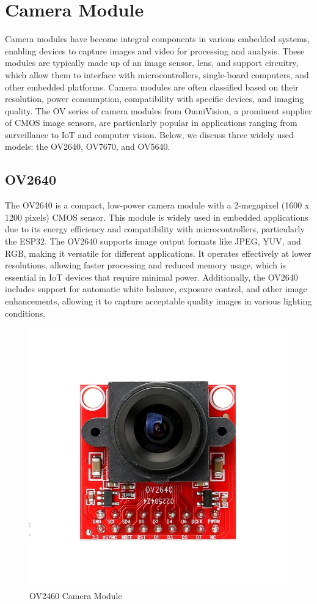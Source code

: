 \section{Camera Module}

Camera modules have become integral components in various embedded systems, enabling devices to capture images and video for processing and analysis. These modules are typically made up of an image sensor, lens, and support circuitry, which allow them to interface with microcontrollers, single-board computers, and other embedded platforms. Camera modules are often classified based on their resolution, power consumption, compatibility with specific devices, and imaging quality. The OV series of camera modules from OmniVision, a prominent supplier of CMOS image sensors, are particularly popular in applications ranging from surveillance to IoT and computer vision. Below, we discuss three widely used models: the OV2640, OV7670, and OV5640.

\subsection{OV2640}
The OV2640 is a compact, low-power camera module with a 2-megapixel (1600 x 1200 pixels) CMOS sensor. This module is widely used in embedded applications due to its energy efficiency and compatibility with microcontrollers, particularly the ESP32. The OV2640 supports image output formats like JPEG, YUV, and RGB, making it versatile for different applications. It operates effectively at lower resolutions, allowing faster processing and reduced memory usage, which is essential in IoT devices that require minimal power. Additionally, the OV2640 includes support for automatic white balance, exposure control, and other image enhancements, allowing it to capture acceptable quality images in various lighting conditions.\cite{OV2640}
\begin{figure}[h]
	\centering
	\includegraphics[width=0.5\linewidth]{assets/ch2/OV2640}
	\caption{OV2460 Camera Module}
	\label{fig:ov2640}
\end{figure}


